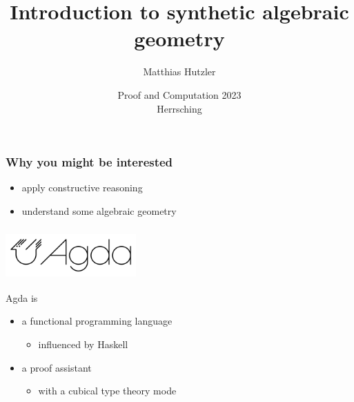 \documentclass[aspectratio=1610]{beamer}
\author{Matthias Hutzler}
\title{Introduction to synthetic algebraic geometry}
\date{Proof and Computation 2023\\Herrsching}
\begin{document}
\begin{frame}
  \maketitle
\end{frame}

\begin{frame}
  \frametitle{Why \alert{you} might be interested}

  \begin{itemize}
    \item
      apply constructive reasoning
    \item
      understand some algebraic geometry
  \end{itemize}
\end{frame}

\begin{frame}
  \frametitle{\includegraphics[width=5cm]{./images/agda-logo.png}}

  Agda is
  \begin{itemize}
    \item
      a functional programming language
      \begin{itemize}
        \item
          influenced by Haskell
      \end{itemize}
    \item
      a proof assistant
      \begin{itemize}
        \item
          with a \alert{cubical type theory} mode
      \end{itemize}
  \end{itemize}
\end{frame}
\end{document}
